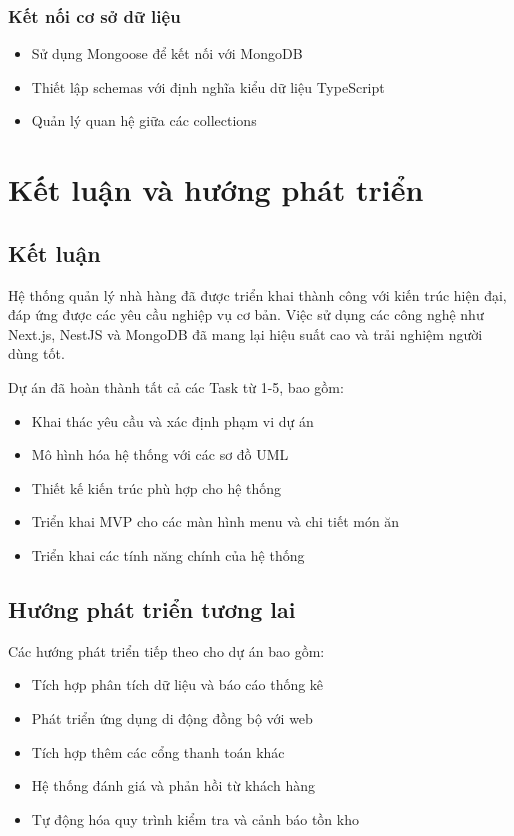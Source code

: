 \documentclass[a4paper]{article}
\begin{document}
        \subsubsection{Kết nối cơ sở dữ liệu}
        \begin{itemize}
            \item Sử dụng Mongoose để kết nối với MongoDB
            \item Thiết lập schemas với định nghĩa kiểu dữ liệu TypeScript
            \item Quản lý quan hệ giữa các collections
        \end{itemize}
   

\section{Kết luận và hướng phát triển}
    \subsection{Kết luận}
    Hệ thống quản lý nhà hàng đã được triển khai thành công với kiến trúc hiện đại, đáp ứng được các yêu cầu nghiệp vụ cơ bản. Việc sử dụng các công nghệ như Next.js, NestJS và MongoDB đã mang lại hiệu suất cao và trải nghiệm người dùng tốt.
    
    Dự án đã hoàn thành tất cả các Task từ 1-5, bao gồm:
    \begin{itemize}
        \item Khai thác yêu cầu và xác định phạm vi dự án
        \item Mô hình hóa hệ thống với các sơ đồ UML
        \item Thiết kế kiến trúc phù hợp cho hệ thống
        \item Triển khai MVP cho các màn hình menu và chi tiết món ăn
        \item Triển khai các tính năng chính của hệ thống
    \end{itemize}
    
    \subsection{Hướng phát triển tương lai}
    Các hướng phát triển tiếp theo cho dự án bao gồm:
    \begin{itemize}
        \item Tích hợp phân tích dữ liệu và báo cáo thống kê
        \item Phát triển ứng dụng di động đồng bộ với web
        \item Tích hợp thêm các cổng thanh toán khác
        \item Hệ thống đánh giá và phản hồi từ khách hàng
        \item Tự động hóa quy trình kiểm tra và cảnh báo tồn kho
    \end{itemize}
\end{document}

